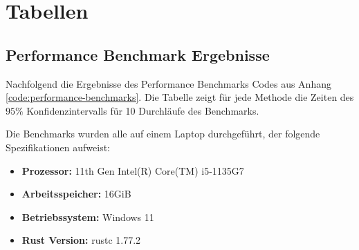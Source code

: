 \chapter{Tabellen}
\label{anhang:chapter-tabellen}

\section{Performance Benchmark Ergebnisse}
\label{anhang:section-tabellen-benchmark}

Nachfolgend die Ergebnisse des Performance Benchmarks Codes aus Anhang \ref{code:performance-benchmarks}. Die Tabelle zeigt für jede Methode die Zeiten des $95\%$ Konfidenzintervalls für 10 Durchläufe des Benchmarks.

Die Benchmarks wurden alle auf einem Laptop durchgeführt, der folgende Spezifikationen aufweist:

\begin{itemize}
    \item \vspace{-0.1cm} \textbf{Prozessor:} 11th Gen Intel(R) Core(TM) i5-1135G7
    \item \vspace{-0.1cm} \textbf{Arbeitsspeicher:} 16\acs{GiB}
    \item \vspace{-0.1cm} \textbf{Betriebssystem:} Windows 11
    \item \vspace{-0.1cm} \textbf{Rust Version:} rustc 1.77.2
\end{itemize}

\vspace*{1.25cm}




